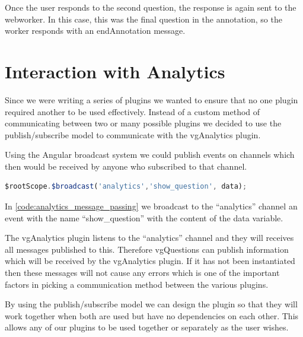 Once the user responds to the second question, the response is again sent to
the \gls{webworker}. In this case, this was the final question in the annotation, so
the worker responds with an endAnnotation message.

\section{Interaction with Analytics}
\label{Section:vgQuestions Analytics}


Since we were writing a series of plugins we wanted to ensure that no one
plugin required another to be used effectively. Instead of a custom method of
communicating between two or many possible plugins we decided to use the
publish/subscribe model to communicate with the vgAnalytics plugin.

Using the Angular broadcast system we could publish events on channels which
then would be received by anyone who subscribed to that channel.

\begin{lstlisting}[language=javascript,caption={AngularJS demonstrating the message passing interface used in the Analytics plugin},label={code:analytics_message_passing}]
$rootScope.$broadcast('analytics','show_question', data);
\end{lstlisting}

In \autoref{code:analytics_message_passing} we broadcast to the ``analytics'' channel an event with the name
``show\_question'' with the content of the data variable.

The vgAnalytics plugin listens to the ``analytics'' channel and they will
receives all messages published to this. Therefore vgQuestions can publish
information which will be received by the vgAnalytics plugin. If it has not
been instantiated then these messages will not cause any errors which is one of
the important factors in picking a communication method between the various
plugins.

By using the publish/subscribe model we can design the plugin so that they will work together when both are used but have no dependencies on each other. This allows any of our plugins to be used together or separately as the
user wishes.
